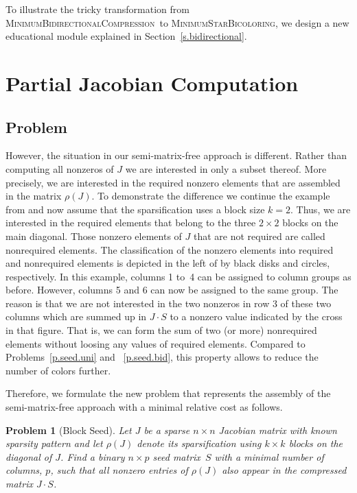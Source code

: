 \documentclass[12pt, oneside]{book}
\newtheorem{problem}{Problem}
\newcommand{\figref}[1]{Figure~\protect\ref{#1}}
\newcommand{\sparsifysymbol}{\ensuremath{\rho}}
\newcommand{\sparsify}[1]{\ensuremath{\sparsifysymbol(#1)}}
\newcommand{\MinStaBic}{\textsc{MinimumStarBicoloring}}
\newcommand{\MinBidCom}{\textsc{MinimumBidirectionalCompression}}
\begin{document}
To illustrate the tricky transformation from \MinBidCom\ to \MinStaBic, we design a new
educational module explained in Section~\ref{s.bidirectional}.

\section{Partial Jacobian Computation}
\subsection{Problem}
However, the situation in our semi-matrix-free approach is different. Rather than
computing all nonzeros of $J$ we are interested in only a subset thereof. More precisely,
we are interested in the required nonzero elements that are assembled in the matrix
\sparsify{J}. To demonstrate the difference we continue the example from 
and now assume that the sparsification uses a block size $k=2$. Thus, we are interested
in the required elements that belong to the three $2 \times 2$ blocks on the main
diagonal. Those nonzero elements of $J$ that are not required are called nonrequired
elements. The classification of the nonzero elements into required and nonrequired
elements is depicted in the left of 
by black disks and circles,
respectively. In this example, columns 1 to~4 can be assigned to column groups as before.
However, columns 5 and 6 can now be assigned to the same group. The reason is that we are
not interested in the two nonzeros in row 3 of these two columns which are summed up in
$J\cdot S$ to a nonzero value indicated by the cross in that figure. That is, we can form
the sum of two (or more) nonrequired elements without loosing any values of required
elements. Compared to Problems~\ref{p.seed.uni} and ~\ref{p.seed.bid}, 
this property allows to reduce the number of
colors further.

Therefore, we formulate the new problem that represents the assembly of the
semi-matrix-free approach with a minimal relative cost as follows.
%
\begin{problem}[Block Seed]
\label{p:block}
%
Let $J$ be a sparse $n \times n$ Jacobian matrix with known sparsity pattern and let
\sparsify{J} denote its sparsification using $k \times k$ blocks on the diagonal of $J$.
Find a binary $n \times p$ seed matrix~$S$ with a minimal number of columns, $p$, such
that all nonzero entries of \sparsify{J} also appear in the compressed matrix $J \cdot
S$.
\end{problem}
\end{document}

